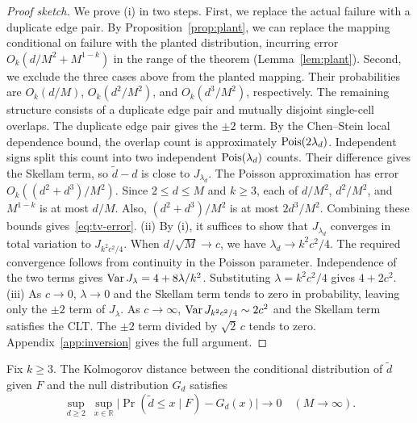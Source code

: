 \begin{proof}[Proof sketch]
We prove (i) in two steps. First, we replace the actual failure with a duplicate edge pair. By Proposition~\ref{prop:plant}, we can replace the mapping conditional on failure with the planted distribution, incurring error $O_k(d/M^2+M^{1-k})$ in the range of the theorem (Lemma~\ref{lem:plant}). Second, we exclude the three cases above from the planted mapping. Their probabilities are $O_k(d/M)$, $O_k(d^2/M^2)$, and $O_k(d^3/M^2)$, respectively. The remaining structure consists of a duplicate edge pair and mutually disjoint single-cell overlaps. The duplicate edge pair gives the $\pm2$ term. By the Chen--Stein local dependence bound\cite[Theorem~1]{arratia1989chen}, the overlap count is approximately $\operatorname{Pois}(2\lambda_d)$. Independent signs split this count into two independent $\operatorname{Pois}(\lambda_d)$ counts. Their difference gives the Skellam term, so $\widetilde d-d$ is close to $J_{\lambda_d}$. The Poisson approximation has error $O_k((d^2+d^3)/M^2)$. Since $2\le d\le M$ and $k\ge3$, each of $d/M^2$, $d^2/M^2$, and $M^{1-k}$ is at most $d/M$. Also, $(d^2+d^3)/M^2$ is at most $2d^3/M^2$. Combining these bounds gives~\eqref{eq:tv-error}.
(ii) By (i), it suffices to show that $J_{\lambda_d}$ converges in total variation to $J_{k^2c^2/4}$. When $d/\sqrt M\to c$, we have $\lambda_d\to k^2c^2/4$. The required convergence follows from continuity in the Poisson parameter. Independence of the two terms gives $\operatorname{Var} J_\lambda=4+8\lambda/k^2$. Substituting $\lambda=k^2c^2/4$ gives $4+2c^2$.
(iii) As $c\to0$, $\lambda\to0$ and the Skellam term tends to zero in probability, leaving only the $\pm2$ term of $J_\lambda$. As $c\to\infty$, $\operatorname{Var} J_{k^2c^2/4}\sim2c^2$ and the Skellam term satisfies the CLT. The $\pm2$ term divided by $\sqrt2\,c$ tends to zero. Appendix~\ref{app:inversion} gives the full argument.
\end{proof}

\begin{theorem}\label{thm:uniform}
Fix $k\ge3$. The Kolmogorov distance between the conditional distribution of $\widetilde d$ given $F$ and the null distribution $G_d$ satisfies
\begin{equation}
\sup_{d\ge2}\ \sup_{x\in\mathbb R}\bigl|\Pr(\widetilde d\le x\mid F)-G_d(x)\bigr|\longrightarrow0
\quad(M\to\infty).\label{eq:uniform}
\end{equation}
\end{theorem}

